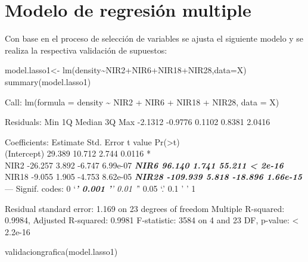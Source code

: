 \documentclass[
]{article}
\newenvironment{Shaded}{\begin{snugshade}}{\end{snugshade}}
\newcommand{\AttributeTok}[1]{\textcolor[rgb]{0.77,0.63,0.00}{#1}}
\newcommand{\FunctionTok}[1]{\textcolor[rgb]{0.00,0.00,0.00}{#1}}
\newcommand{\NormalTok}[1]{#1}
\newcommand{\OtherTok}[1]{\textcolor[rgb]{0.56,0.35,0.01}{#1}}
\newcommand{\SpecialCharTok}[1]{\textcolor[rgb]{0.00,0.00,0.00}{#1}}
\begin{document}
\hypertarget{modelo-de-regresiuxf3n-multiple}{%
\section{Modelo de regresión
multiple}\label{modelo-de-regresiuxf3n-multiple}}

Con base en el proceso de selección de variables se ajusta el siguiente
modelo y se realiza la respectiva validación de supuestos:

\begin{Shaded}
\begin{Highlighting}[]
\NormalTok{model.lasso1}\OtherTok{\textless{}{-}} \FunctionTok{lm}\NormalTok{(density}\SpecialCharTok{\textasciitilde{}}\NormalTok{NIR2}\SpecialCharTok{+}\NormalTok{NIR6}\SpecialCharTok{+}\NormalTok{NIR18}\SpecialCharTok{+}\NormalTok{NIR28,}\AttributeTok{data=}\NormalTok{X)}
\FunctionTok{summary}\NormalTok{(model.lasso1)}
\end{Highlighting}
\end{Shaded}

Call: lm(formula = density \textasciitilde{} NIR2 + NIR6 + NIR18 +
NIR28, data = X)

Residuals: Min 1Q Median 3Q Max -2.1312 -0.9776 0.1102 0.8381 2.0416

Coefficients: Estimate Std. Error t value
Pr(\textgreater\textbar t\textbar)\\
(Intercept) 29.389 10.712 2.744 0.0116 *\\
NIR2 -26.257 3.892 -6.747 6.99e-07 \textbf{\emph{ NIR6 96.140 1.741
55.211 \textless{} 2e-16 }} NIR18 -9.055 1.905 -4.753 8.62e-05
\textbf{\emph{ NIR28 -109.939 5.818 -18.896 1.66e-15 }} --- Signif.
codes: 0 `\emph{\textbf{' 0.001 '}' 0.01 '}' 0.05 `.' 0.1 ' ' 1

Residual standard error: 1.169 on 23 degrees of freedom Multiple
R-squared: 0.9984, Adjusted R-squared: 0.9981 F-statistic: 3584 on 4 and
23 DF, p-value: \textless{} 2.2e-16

\begin{Shaded}
\begin{Highlighting}[]
\FunctionTok{validaciongrafica}\NormalTok{(model.lasso1)}
\end{Highlighting}
\end{Shaded}
\end{document}
